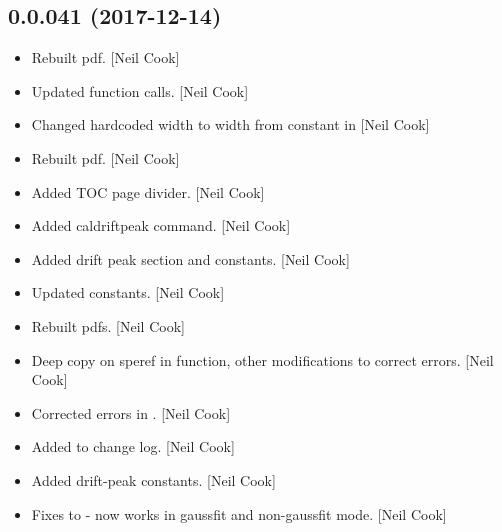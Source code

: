 \documentclass[a4paper,10pt,english]{report}
\begin{document}
\subsection{0.0.041 (2017-12-14)}
\label{\detokenize{misc/changelog:id510}}\begin{itemize}
\item {} 
Rebuilt pdf. {[}Neil Cook{]}

\item {} 
Updated  function calls. {[}Neil Cook{]}

\item {} 
Changed hardcoded width to width from constant in  {[}Neil
Cook{]}

\item {} 
Rebuilt pdf. {[}Neil Cook{]}

\item {} 
Added TOC page divider. {[}Neil Cook{]}

\item {} 
Added caldriftpeak command. {[}Neil Cook{]}

\item {} 
Added drift peak section and constants. {[}Neil Cook{]}

\item {} 
Updated constants. {[}Neil Cook{]}

\item {} 
Rebuilt pdfs. {[}Neil Cook{]}

\item {} 
Deep copy on speref in  function, other modifications
to correct errors. {[}Neil Cook{]}

\item {} 
Corrected errors in . {[}Neil Cook{]}

\item {} 
Added to change log. {[}Neil Cook{]}

\item {} 
Added drift-peak constants. {[}Neil Cook{]}

\item {} 
Fixes to  - now works in gaussfit and non-gaussfit mode.
{[}Neil Cook{]}

\end{itemize}
\end{document}
